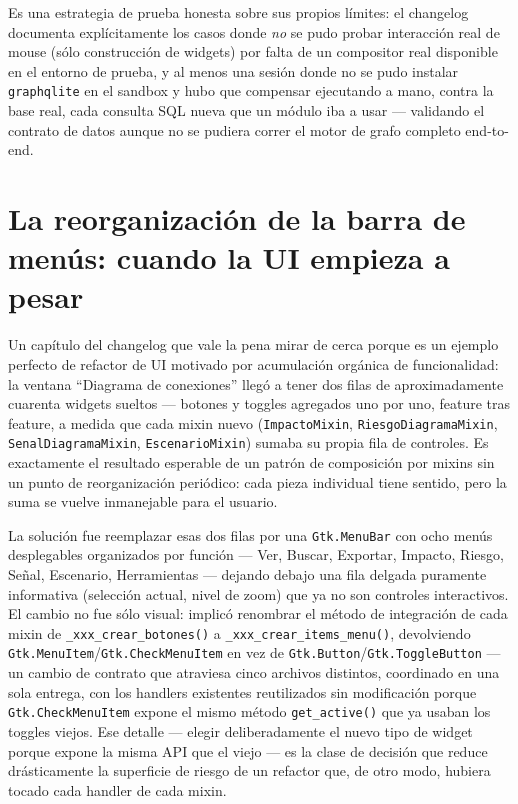 \documentclass[11pt,twocolumn]{article}
\begin{document}
Es una estrategia de prueba honesta sobre sus propios límites: el changelog documenta explícitamente los casos donde \emph{no} se pudo probar interacción real de mouse (sólo construcción de widgets) por falta de un compositor real disponible en el entorno de prueba, y al menos una sesión donde no se pudo instalar \texttt{graphqlite} en el sandbox y hubo que compensar ejecutando a mano, contra la base real, cada consulta SQL nueva que un módulo iba a usar --- validando el contrato de datos aunque no se pudiera correr el motor de grafo completo end-to-end. \section{La reorganización de la barra de menús: cuando la UI empieza a pesar}

Un capítulo del changelog que vale la pena mirar de cerca porque es un ejemplo perfecto de refactor de UI motivado por acumulación orgánica de funcionalidad: la ventana ``Diagrama de conexiones'' llegó a tener dos filas de aproximadamente cuarenta widgets sueltos --- botones y toggles agregados uno por uno, feature tras feature, a medida que cada mixin nuevo (\texttt{ImpactoMixin}, \texttt{RiesgoDiagramaMixin}, \texttt{SenalDiagramaMixin}, \texttt{EscenarioMixin}) sumaba su propia fila de controles. Es exactamente el resultado esperable de un patrón de composición por mixins sin un punto de reorganización periódico: cada pieza individual tiene sentido, pero la suma se vuelve inmanejable para el usuario.

La solución fue reemplazar esas dos filas por una \texttt{Gtk.MenuBar} con ocho menús desplegables organizados por función --- Ver, Buscar, Exportar, Impacto, Riesgo, Señal, Escenario, Herramientas --- dejando debajo una fila delgada puramente informativa (selección actual, nivel de zoom) que ya no son controles interactivos. El cambio no fue sólo visual: implicó renombrar el método de integración de cada mixin de \texttt{\_xxx\_crear\_botones()} a \texttt{\_xxx\_crear\_items\_menu()}, devolviendo \texttt{Gtk.MenuItem}/\texttt{Gtk.CheckMenuItem} en vez de \texttt{Gtk.Button}/\texttt{Gtk.ToggleButton} --- un cambio de contrato que atraviesa cinco archivos distintos, coordinado en una sola entrega, con los handlers existentes reutilizados sin modificación porque \texttt{Gtk.CheckMenuItem} expone el mismo método \texttt{get\_active()} que ya usaban los toggles viejos. Ese detalle --- elegir deliberadamente el nuevo tipo de widget porque expone la misma API que el viejo --- es la clase de decisión que reduce drásticamente la superficie de riesgo de un refactor que, de otro modo, hubiera tocado cada handler de cada mixin.
\end{document}
